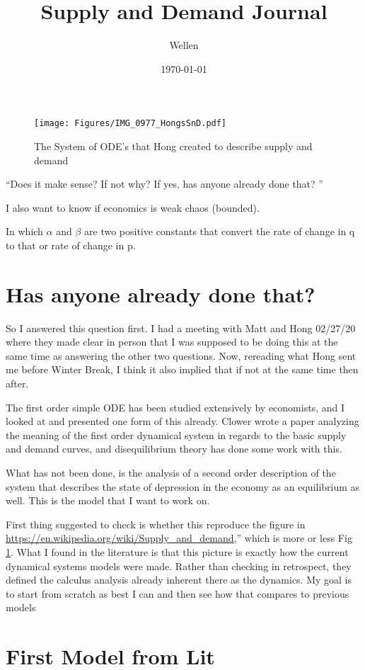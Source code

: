 \documentclass{article}
\title{Supply and Demand Journal}
\author{Wellen}
\date{\today}
\begin{document}
\begin{figure}%
\texttt{[image: Figures/IMG\_0977\_HongsSnD.pdf]}%
\caption{The System of ODE's that Hong created to describe supply and demand}%
\label{hong}%
\end{figure}

``Does it make sense?  If not why?  If yes, has anyone already done that? ''

I also want to know if economics is weak chaos (bounded).

In which $\alpha$ and $\beta$ are two positive constants that convert the rate of change in q to that or rate of change in p.

\section{Has anyone already done that?}
So I answered this question first. I had a meeting with Matt and Hong 02/27/20 where they made clear in person that I was supposed to be doing this at the same time as answering the other two questions. Now, rereading what Hong sent me before Winter Break, I think it also implied that if not at the same time then after. 

The first order simple ODE has been studied extensively by economists, and I looked at and presented one form of this already. Clower wrote a paper analyzing the meaning of the first order dynamical system in regards to the basic supply and demand curves, and disequilibrium theory has done some work with this. 

What has not been done, is the analysis of a second order description of the system that describes the state of depression in the economy as an equilibrium as well. This is the model that I want to work on.

First thing suggested to check is whether this reproduce the figure in
\url{https://en.wikipedia.org/wiki/Supply_and_demand},'' which is more or less Fig \ref{hong}. What I found in the literature is that this picture is exactly how the current dynamical systems models were made. Rather than checking in retrospect, they defined the calculus analysis already inherent there as the dynamics. My goal is to start from scratch as best I can and then see how that compares to previous models


\section{First Model from Lit}
\end{document}
